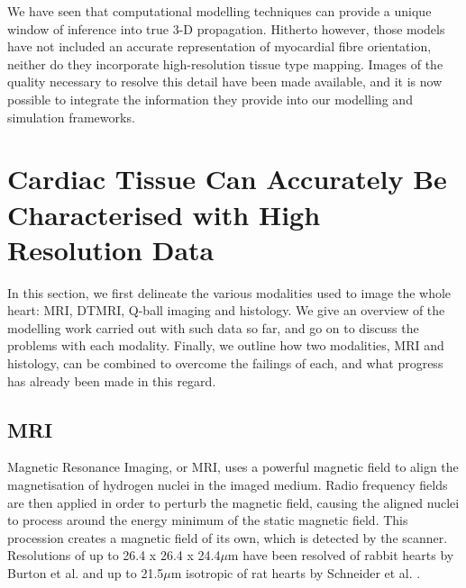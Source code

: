   We have seen that computational modelling techniques can provide a unique window of inference into true 3-D propagation. Hitherto however, those models have not included an accurate representation of myocardial fibre orientation, neither do they incorporate high-resolution tissue type mapping. Images of the quality necessary to resolve this detail have been made available, and it is now possible to integrate the information they provide into our modelling and simulation frameworks.

\section{Cardiac Tissue Can Accurately Be Characterised with High Resolution Data} %
\label{sec:cardiac_tissue_can_be_accurately_characterised_with_high_resolution_data}
  In this section, we first delineate the various modalities used to image the whole heart: MRI, DTMRI, Q-ball imaging and histology. We give an overview of the modelling work carried out with such data so far, and go on to discuss the problems with each modality. Finally, we outline how two modalities, MRI and histology, can be combined to overcome the failings of each, and what progress has already been made in this regard.
  
  \subsection{MRI} %
  \label{sub:mri}
    Magnetic Resonance Imaging, or MRI, uses a powerful magnetic field to align the magnetisation of hydrogen nuclei in the imaged medium. Radio frequency fields are then applied in order to perturb the magnetic field, causing the aligned nuclei to process around the energy minimum of the static magnetic field. This procession creates a magnetic field of its own, which is detected by the scanner. Resolutions of up to 26.4 x 26.4 x 24.4$\mu$m have been resolved of rabbit hearts by Burton et al. \cite{Burton:2006p100} and up to 21.5$\mu$m isotropic of rat hearts by Schneider et al. \cite{Schneider:2004p998}.
    
  
